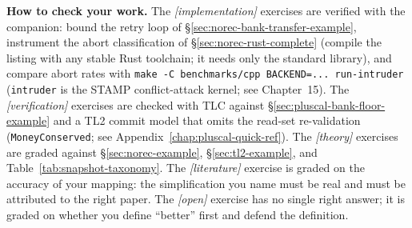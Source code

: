 \textbf{How to check your work.} The \emph{[implementation]} exercises are
verified with the companion: bound the retry loop of
\S\ref{sec:norec-bank-transfer-example}, instrument the abort
classification of \S\ref{sec:norec-rust-complete} (compile the listing
with any stable Rust toolchain; it needs only the standard library), and
compare abort rates with
\texttt{make -C benchmarks/cpp BACKEND=... run-intruder} (\texttt{intruder} is
the STAMP conflict-attack kernel; see Chapter~15).  The
\emph{[verification]} exercises are checked with TLC against
\S\ref{sec:pluscal-bank-floor-example} and a TL2 commit model that omits the
read-set re-validation (\texttt{MoneyConserved}; see
Appendix~\ref{chap:pluscal-quick-ref}).  The \emph{[theory]} exercises are
graded against \S\ref{sec:norec-example}, \S\ref{sec:tl2-example}, and
Table~\ref{tab:snapshot-taxonomy}.  The \emph{[literature]} exercise is
graded on the accuracy of your mapping: the simplification you name must
be real and must be attributed to the right paper.  The \emph{[open]}
exercise has no single right answer; it is graded on whether you define
``better'' first and defend the definition.

